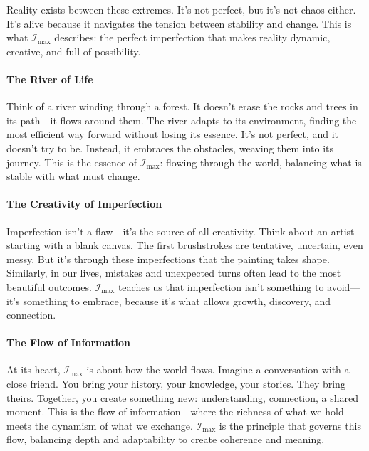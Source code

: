 \documentclass[12pt]{article}
\begin{document}
Reality exists between these extremes. It’s not perfect, but it’s not chaos either. It’s alive because it navigates the tension between stability and change. This is what \(\mathcal{I}_{\text{max}}\) describes: the perfect imperfection that makes reality dynamic, creative, and full of possibility.

\paragraph{The River of Life}
Think of a river winding through a forest. It doesn’t erase the rocks and trees in its path—it flows around them. The river adapts to its environment, finding the most efficient way forward without losing its essence. It’s not perfect, and it doesn’t try to be. Instead, it embraces the obstacles, weaving them into its journey. This is the essence of \(\mathcal{I}_{\text{max}}\): flowing through the world, balancing what is stable with what must change.

\paragraph{The Creativity of Imperfection}
Imperfection isn’t a flaw—it’s the source of all creativity. Think about an artist starting with a blank canvas. The first brushstrokes are tentative, uncertain, even messy. But it’s through these imperfections that the painting takes shape. Similarly, in our lives, mistakes and unexpected turns often lead to the most beautiful outcomes. \(\mathcal{I}_{\text{max}}\) teaches us that imperfection isn’t something to avoid—it’s something to embrace, because it’s what allows growth, discovery, and connection.

\paragraph{The Flow of Information}
At its heart, \(\mathcal{I}_{\text{max}}\) is about how the world flows. Imagine a conversation with a close friend. You bring your history, your knowledge, your stories. They bring theirs. Together, you create something new: understanding, connection, a shared moment. This is the flow of information—where the richness of what we hold meets the dynamism of what we exchange. \(\mathcal{I}_{\text{max}}\) is the principle that governs this flow, balancing depth and adaptability to create coherence and meaning.
\end{document}
